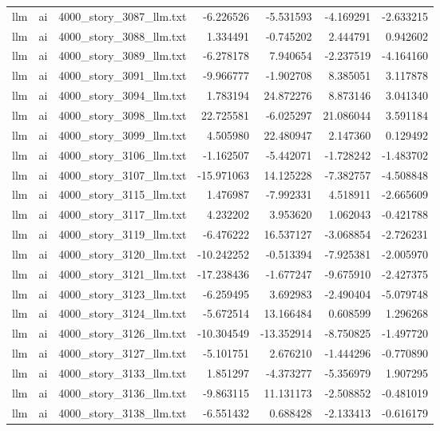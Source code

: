 \begin{longtable}{lllrrrr}
llm & ai & 4000\_story\_3087\_llm.txt & -6.226526 & -5.531593 & -4.169291 & -2.633215 \\
llm & ai & 4000\_story\_3088\_llm.txt & 1.334491 & -0.745202 & 2.444791 & 0.942602 \\
llm & ai & 4000\_story\_3089\_llm.txt & -6.278178 & 7.940654 & -2.237519 & -4.164160 \\
llm & ai & 4000\_story\_3091\_llm.txt & -9.966777 & -1.902708 & 8.385051 & 3.117878 \\
llm & ai & 4000\_story\_3094\_llm.txt & 1.783194 & 24.872276 & 8.873146 & 3.041340 \\
llm & ai & 4000\_story\_3098\_llm.txt & 22.725581 & -6.025297 & 21.086044 & 3.591184 \\
llm & ai & 4000\_story\_3099\_llm.txt & 4.505980 & 22.480947 & 2.147360 & 0.129492 \\
llm & ai & 4000\_story\_3106\_llm.txt & -1.162507 & -5.442071 & -1.728242 & -1.483702 \\
llm & ai & 4000\_story\_3107\_llm.txt & -15.971063 & 14.125228 & -7.382757 & -4.508848 \\
llm & ai & 4000\_story\_3115\_llm.txt & 1.476987 & -7.992331 & 4.518911 & -2.665609 \\
llm & ai & 4000\_story\_3117\_llm.txt & 4.232202 & 3.953620 & 1.062043 & -0.421788 \\
llm & ai & 4000\_story\_3119\_llm.txt & -6.476222 & 16.537127 & -3.068854 & -2.726231 \\
llm & ai & 4000\_story\_3120\_llm.txt & -10.242252 & -0.513394 & -7.925381 & -2.005970 \\
llm & ai & 4000\_story\_3121\_llm.txt & -17.238436 & -1.677247 & -9.675910 & -2.427375 \\
llm & ai & 4000\_story\_3123\_llm.txt & -6.259495 & 3.692983 & -2.490404 & -5.079748 \\
llm & ai & 4000\_story\_3124\_llm.txt & -5.672514 & 13.166484 & 0.608599 & 1.296268 \\
llm & ai & 4000\_story\_3126\_llm.txt & -10.304549 & -13.352914 & -8.750825 & -1.497720 \\
llm & ai & 4000\_story\_3127\_llm.txt & -5.101751 & 2.676210 & -1.444296 & -0.770890 \\
llm & ai & 4000\_story\_3133\_llm.txt & 1.851297 & -4.373277 & -5.356979 & 1.907295 \\
llm & ai & 4000\_story\_3136\_llm.txt & -9.863115 & 11.131173 & -2.508852 & -0.481019 \\
llm & ai & 4000\_story\_3138\_llm.txt & -6.551432 & 0.688428 & -2.133413 & -0.616179 \\

\end{longtable}
